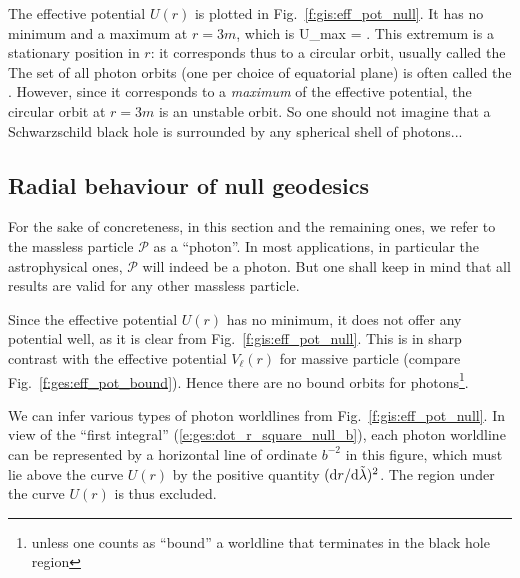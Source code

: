 The effective potential $U(r)$ is plotted in Fig.~\ref{f:gis:eff_pot_null}.
It has no minimum and a maximum at $r=3m$, which is
\be \label{e:ges:U_max}
    U_{\rm max} =  .
\ee
This extremum is a stationary position in $r$: it corresponds thus to a circular
orbit, usually called the
The set of all photon orbits (one per choice of equatorial plane) is often
called the .
However, since it corresponds to a \emph{maximum} of the effective potential, the circular
orbit at $r=3m$ is an unstable orbit. So one should not imagine that a
Schwarzschild black hole is surrounded by any spherical shell of photons...


\subsection{Radial behaviour of null geodesics} \label{s:ges:null_radial_behav}

For the sake of concreteness, in this section and the remaining ones, we
refer to the massless particle $\mathscr{P}$ as a ``photon''. In most applications, in
particular the astrophysical ones, $\mathscr{P}$ will indeed be a photon.
But one shall keep in mind that all results are valid for any other massless
particle.

Since the effective potential
$U(r)$ has no minimum, it does not offer any potential well,
as it is clear from Fig.~\ref{f:gis:eff_pot_null}. This is in sharp contrast
with the effective potential $V_\ell(r)$ for massive particle
(compare Fig.~\ref{f:ges:eff_pot_bound}). Hence there are no bound orbits
for photons\footnote{unless one counts as ``bound'' a worldline that terminates in the
black hole region}.

We can infer various types of photon worldlines from Fig.~\ref{f:gis:eff_pot_null}.
In view of the ``first integral'' (\ref{e:ges:dot_r_square_null_b}),
each photon worldline can be represented by a horizontal line of ordinate
$b^{-2}$ in this figure, which must lie above the curve $U(r)$
by the positive quantity $({\mathrm{d} r}/{\mathrm{d}\tilde{\lambda}})^2$. The region under the curve
$U(r)$ is thus excluded.


